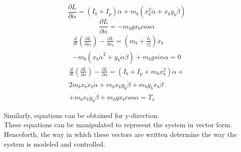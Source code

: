 \documentclass[conference]{IEEEtran}
\begin{document}
\begin{equation}
\frac{\partial L}{\partial \dot \alpha} = (I_{b} + I_{p})\dot\alpha + m_{b}(x_{b}^{2}\dot\alpha + x_{b}y_{b}\dot\beta)
\label{eq9}\end{equation}
\begin{equation}
\frac{\partial L}{\partial \alpha} = -m_{b}gx_{b}cos\alpha
\label{eq10}\end{equation}
\begin{equation}
\begin{split}
\frac{d}{dt}\left(\frac{\partial L}{\partial \dot x_{b}}\right) - \frac{\partial L}{\partial x_{b}} = \left(m_{b} + \frac{I_{b}}{r_{b}^{2}}\right)\ddot x_{b} \\- m_{b}(x_{b}\dot\alpha^{2} + y_{b}\dot\alpha\dot\beta) + m_{b}gsin\alpha = 0
\end{split}
\label{eq11}\end{equation}
\begin{equation}
\begin{split}
\frac{d}{dt}\left(\frac{\partial L}{\partial \dot \alpha}\right) - \frac{\partial L}{\partial \alpha} = (I_{b} + I_{p}  + m_{b}x_{b}^{2})\ddot \alpha + \\2m_{b}x_{b}\dot x_{b} \dot \alpha + m_{b}x_{b} y_{b} \ddot \beta + m_{b}y_{b}\dot x_{b} \dot \beta \\+ m_{b}x_{b}\dot y_{b} \dot \beta + m_{b}gx_{b}cos\alpha = T_{x}
\end{split}
\label{eq12}\end{equation}

Similarly, equations can be obtained for y-direction. \\
These equations can be manipulated to represent the system in vector form. Henceforth, the way in which these vectors are written determine the way the system is modeled and controlled.
\end{document}
